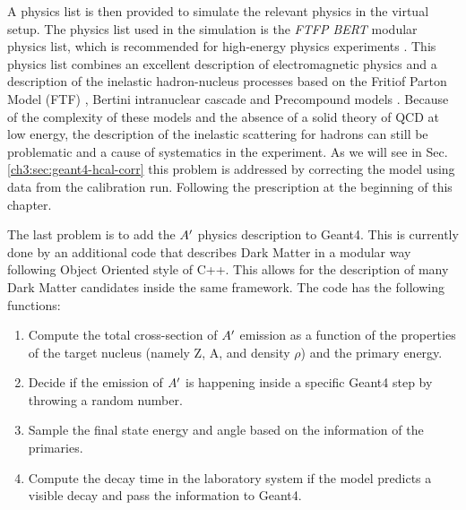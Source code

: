 A physics list is then provided to simulate the relevant physics in the virtual setup. The physics list used in the simulation is the \textit{FTFP BERT} modular physics list, which is recommended for high-energy physics experiments \cite{ALLISON2016186}. This physics list combines an excellent description of electromagnetic physics and a description of the inelastic hadron-nucleus processes based on the Fritiof Parton Model (FTF) \cite{Uzhinsky:2013hea}, Bertini intranuclear cascade \cite{Heikkinen:2003sc} and Precompound models \cite{Apostolakis:2009zz}. Because of the complexity of these models and the absence of a solid theory of QCD at low energy, the description of the inelastic scattering for hadrons can still be problematic and a cause of systematics in the experiment. As we will see in Sec.\ref{ch3:sec:geant4-hcal-corr} this problem is addressed by correcting the model using data from the calibration run. Following the prescription at the beginning of this chapter.

The last problem is to add the $A'$ physics description to Geant4. This is currently done by an additional code that describes Dark Matter in a modular way following Object Oriented style of C++. This allows for the description of many Dark Matter candidates inside the same framework. The code has the following functions:

\begin{enumerate}
\item Compute the total cross-section of $A'$ emission as a function of the properties of the target nucleus (namely Z, A, and density $\rho$) and the primary energy.
\item Decide if the emission of $A'$ is happening inside a specific Geant4 step by throwing a random number.
\item Sample the final state energy and angle based on the information of the primaries.
\item Compute the decay time in the laboratory system if the model predicts a visible decay and pass the information to Geant4.
\end{enumerate}

